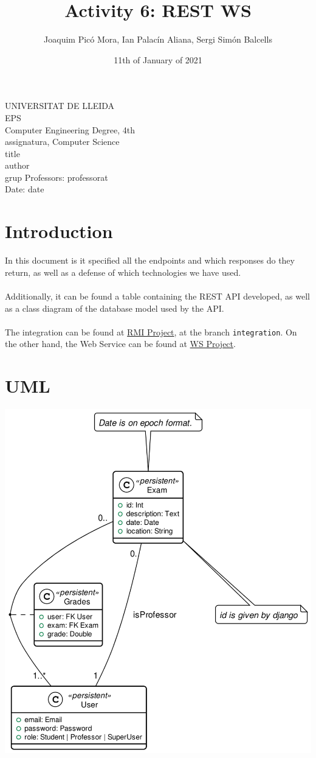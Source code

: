 \documentclass[11pt]{article}
\title{Activity 6: REST WS}
\author{Joaquim Picó Mora, Ian Palacín Aliana, Sergi Simón Balcells}
\date{11th of January of 2021}
\renewcommand{\maketitle}{ %
	\begin{titlepage}
		\raggedright{UNIVERSITAT DE LLEIDA \\
			EPS \\
			Computer Engineering Degree, 4th\\
			\1assignatura, Computer Science\\}
		\vspace{5cm}
		\centering
		\huge{\5title \\}
		\vspace{3cm}
		\large{\6author} \\
		\normalsize{\3grup}
		\vfill
		Professors: \4professorat \\
		Date: \7date
\end{titlepage}}
\begin{document}
	\maketitle
\thispagestyle{empty}
\newpage
{}
\tableofcontents
\newpage
{}


\section{Introduction}
\label{sec:orgde35f88}
In this document is it specified all the endpoints and which responses
do they return, as well as a defense of which technologies we have used.
\\
\\
Additionally, it can be found a table containing the REST API developed,
as well as a class diagram of the database model used by the API.
\\
\\
The integration can be found at \href{https://github.com/sergisi/java-rmi/tree/integration}{RMI Project}, at
the branch \texttt{integration}. On the other hand, the Web Service can be found at
\href{https://github.com/quimpm/ws-distcomp}{WS Project}.

\section{UML}
\label{sec:org11252ab}
\begin{center}
\includegraphics[width=.9\linewidth]{img/message_passing.png}
\end{center}
\end{document}
